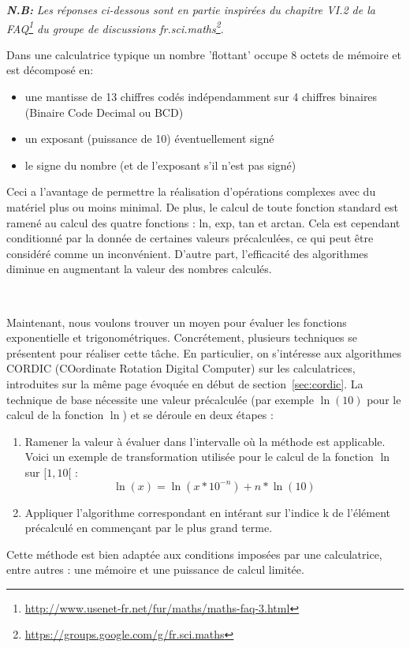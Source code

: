 \documentclass{article}
\begin{document}
{\small \textit{\textbf{N.B:}} \emph{ Les réponses ci-dessous sont en partie inspirées du chapitre VI.2 de la FAQ\footnote{\url{http://www.usenet-fr.net/fur/maths/maths-faq-3.html}} du groupe de discussions fr.sci.maths\footnote{\url{https://groups.google.com/g/fr.sci.maths}}}.
  \vskip 0.01mm ~
 
  Dans une calculatrice typique un nombre 'flottant' occupe 8 octets de m\'emoire et est d\'ecompos\'e en:
  \begin{itemize}
     \item une mantisse de 13 chiffres cod\'es ind\'ependamment sur 4 chiffres binaires (Binaire Code Decimal ou BCD)
     \item un exposant (puissance de 10) \'eventuellement sign\'e
     \item le signe du nombre (et de l'exposant s'il n'est pas sign\'e)
  \end{itemize}

  
  Ceci a l'avantage de permettre la r\'ealisation d'op\'erations complexes avec du mat\'eriel plus ou moins minimal. De plus, le calcul de toute fonction standard est ramen\'e au calcul des quatre fonctions : ln, exp, tan et arctan. Cela est cependant conditionn\'e par la donnée de certaines valeurs pr\'ecalcul\'ees, ce qui peut \^etre consid\'er\'e comme un inconv\'enient. D'autre part, l'efficacit\'e des algorithmes diminue en augmentant la valeur des nombres calcul\'es.

  \vskip 1mm ~


  Maintenant, nous voulons trouver un moyen pour évaluer les fonctions exponentielle et trigonométriques. Concr\'etement, plusieurs techniques se pr\'esentent pour r\'ealiser cette t\^ache. En particulier, on s'int\'eresse aux algorithmes CORDIC (COordinate Rotation Digital Computer) sur les calculatrices, introduites sur la m\^eme page évoquée en début de section~\ref{sec:cordic}. La technique de base nécessite une valeur pr\'ecalcul\'ee (par exemple $\ln(10)$ pour le calcul de la fonction $\ln$) et se d\'eroule en deux \'etapes :
  \begin{enumerate}
  \item Ramener la valeur à \'evaluer dans l'intervalle où la m\'ethode est applicable. Voici un exemple de transformation utilis\'ee pour le calcul de la fonction $\ln$ sur $[1,10[$ :
      \begin{equation}
        \ln(x) = \ln(x*10^{-n}) + n*\ln(10)
      \end{equation}
    \item Appliquer l'algorithme correspondant en int\'erant sur l'indice k de l'\'el\'ement pr\'ecalcul\'e en commen\c cant par le plus grand terme.
  \end{enumerate}
  Cette m\'ethode est bien adapt\'ee aux conditions impos\'ees par une calculatrice, entre autres : une m\'emoire et une puissance de calcul limit\'ee.
  \vskip 1mm ~

}
\end{document}
